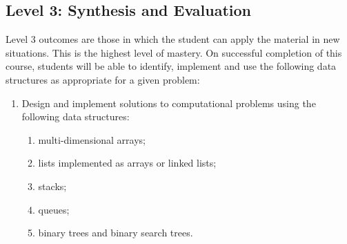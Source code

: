 \documentclass[12pt]{scrartcl}
\begin{document}
\subsection*{Level 3: Synthesis and Evaluation}
Level 3 outcomes are those in which the student can apply the material in new situations. This is the highest level of mastery. On successful completion of this course, students will be able to identify, implement and use the following data structures as appropriate for a given problem:
\begin{enumerate}
    \item Design and implement solutions to computational problems using the following data structures:
    \begin{enumerate}
        \item multi-dimensional arrays;
        \item lists implemented as arrays or linked lists;
        \item stacks;
        \item queues;
        \item binary trees and binary search trees.
    \end{enumerate}
\end{enumerate}



\end{document}
